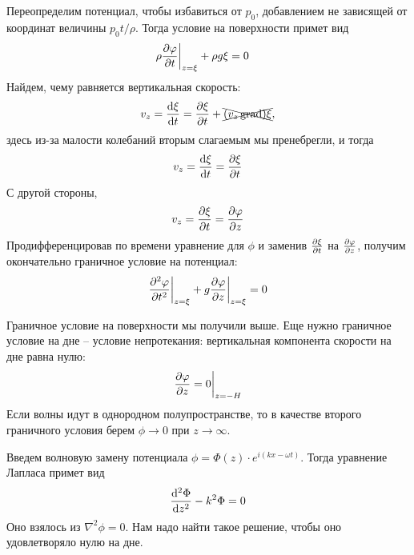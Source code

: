 Переопределим потенциал, чтобы избавиться от $p_0$, добавлением не зависящей от координат величины $p_0t/\rho$. Тогда условие на поверхности примет вид
\begin{equation}
	\rho\pdv{\varphi}{t}\bigg|_{z=\xi}+\rho g\xi=0 \quad 
\end{equation}
Найдем, чему равняется вертикальная скорость:
\begin{equation}
	v_z=\dv{\xi}{t}=\pdv{\xi}{t}+\xcancel{(v_z\operatorname{grad})\xi},
\end{equation}
здесь из-за малости колебаний вторым слагаемым мы пренебрегли,  и тогда
\begin{equation}
	v_z=\dv{\xi}{t}=\pdv{\xi}{t}
\end{equation}
С другой стороны, 
\begin{equation}
	v_z=\pdv{\xi}{t}=\pdv{\varphi}{z}
\end{equation}
Продифференцировав по времени уравнение для $\phi$ и заменив $\pdv{\xi}{t}$ на $\pdv{\varphi}{z}$, получим окончательно граничное условие  на потенциал:
\begin{equation}
	\pdv[2]{\varphi}{t}\bigg|_{z=\xi}+g\pdv{\varphi}{z}\bigg|_{z=\xi}=0
\end{equation}

Граничное условие на поверхности мы получили выше. Еще нужно граничное условие на дне -- условие непротекания: вертикальная компонента скорости на дне равна нулю:
\begin{equation}
	\pdv{\varphi}{z}=0 \bigg|_{z=-H}
\end{equation}
Если волны идут в однородном полупространстве, то в качестве второго
граничного условия берем $\phi \to 0$ при $z\to\infty$.

Введем волновую замену потенциала $\phi=\Phi(z)\cdot e^{i(kx- \omega t)}$. Тогда уравнение Лапласа примет вид
\begin{equation}
	\dv[2]{\Phi}{z}-k^2\Phi=0
\end{equation}
Оно взялось из $\nabla^2\phi=0$. Нам надо найти такое решение, чтобы оно удовлетворяло нулю на дне. 

